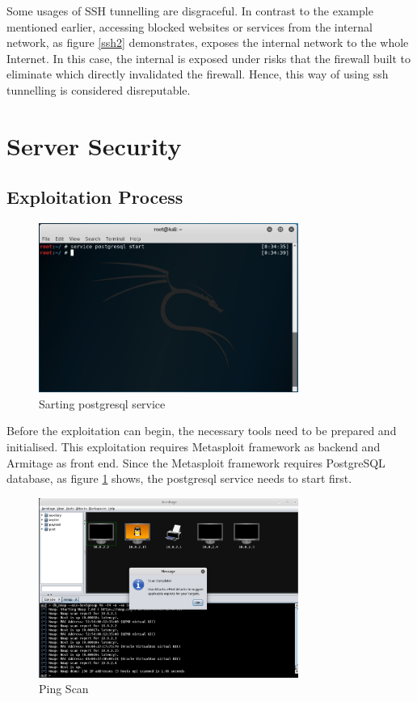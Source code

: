 \documentclass{article}
\begin{document}
Some usages of SSH tunnelling are disgraceful. In contrast to the example mentioned 
earlier, accessing blocked websites or services from the internal network, 
as figure \ref{ssh2} demonstrates, exposes the internal network to the whole Internet. 
In this case, the internal is exposed under risks that the firewall built to eliminate which directly 
invalidated the firewall. Hence, this way of using ssh tunnelling is considered disreputable. 

\section{Server Security}
\label{sec:serversec}

\subsection{Exploitation Process}
\begin{figure}[H]
  \includegraphics[width=8.5cm]{kali1}
  \caption{Sarting postgresql service}
  \label{kali1}
\end{figure}

Before the exploitation can begin, the necessary tools need to be prepared and initialised.
This exploitation requires Metasploit framework as backend and Armitage as front end. Since the 
Metasploit framework requires PostgreSQL database, as figure \ref{kali1} shows, 
the postgresql service needs to start first.

\begin{figure}[H]
  \includegraphics[width=8.5cm]{kali2}
  \caption{Ping Scan}
  \label{kali2}
\end{figure}
\end{document}
